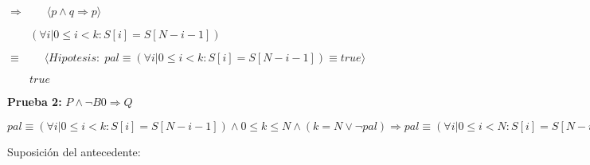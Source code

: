 \documentclass[hidelinks]{article}
\begin{document}
$\Rightarrow  \qquad \langle p \land q \Rightarrow p  \rangle$ \par

$\qquad (\forall i | 0 \leq i < k : S[i]=S[N-i-1])$ \par

$\equiv  \qquad \langle Hipotesis: \; pal \equiv (\forall i | 0 \leq i < k : S[i]=S[N-i-1]) \equiv true  \rangle$ \par

$\qquad true$ \par

\newpage

\textbf{Prueba 2:} $P \land \neg B0 \Rightarrow Q$ \par

$pal \equiv (\forall i | 0 \leq i < k : S[i]=S[N-i-1]) \land 0 \leq k \leq N \land (k=N \lor \neg pal) \Rightarrow pal \equiv (\forall i | 0 \leq i < N : S[i]=S[N-i-1])$

\vspace{1em}

Suposición del antecedente:

\newpage
\end{document}
